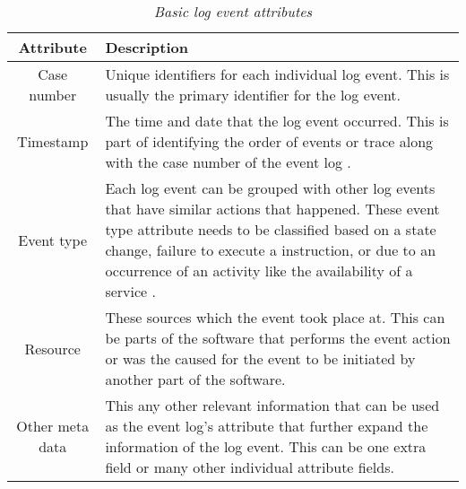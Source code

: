 \begin{table}[!htb]
	\centering
	\small
	\caption[Basic log event attributes]
	{\textit{Basic log event attributes \cite{Bekeneva2020a}}}
	\label{tbl:CH1_Log_Basic_Attributes}
	\begin{tabularx}{\textwidth}{|c|X|}
		\hline \textbf{Attribute} & \textbf{Description} \\
		\hline Case number & Unique identifiers for each individual log event. This is usually the primary identifier for the log event. \\
		\hline Timestamp & The time and date that the log event occurred. This is part of identifying the order of events or trace along with the case number of the event log \cite{Kherbouche2017}. \\
		\hline Event type & Each log event can be grouped with other log events that have similar actions that happened. These event type attribute needs to be classified based on a state change, failure to execute a instruction, or due to an occurrence of an activity like the availability of a service \cite{Fedaghi2010}. \\
		\hline Resource & These sources which the event took place at. This can be parts of the software that performs the event action or was the caused for the event to be initiated by another part of the software. \\
		\hline Other meta data & This any other relevant information that can be used as the event log's attribute that further expand the information of the log event. This can be one extra field or many other individual attribute fields.\\
		\hline
	\end{tabularx}
\end{table}

